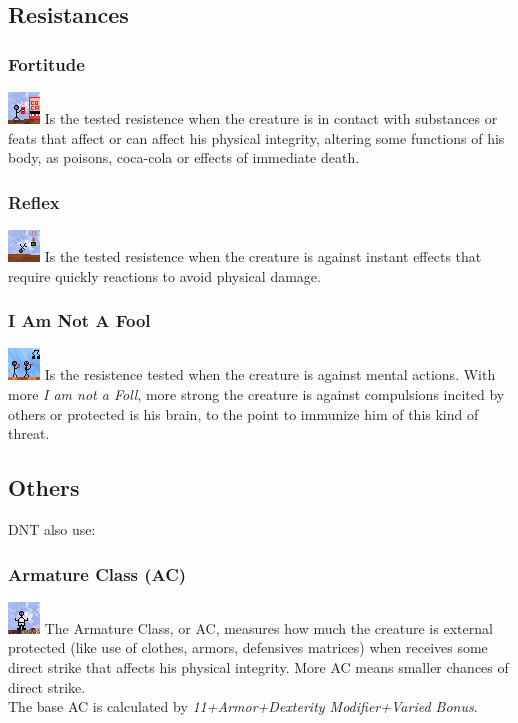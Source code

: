 \documentclass[ letterpaper,12pt]{article}
\begin{document}
\subsection{Resistances}

\subsubsection{Fortitude}
\includegraphics{../data/skills/Img/fortitude.png}
Is the tested resistence when the creature is in contact with substances or
feats that affect or can affect his physical integrity, altering some
functions of his body, as poisons, coca-cola or effects of immediate death.

\subsubsection{Reflex}
\includegraphics{../data/skills/Img/reflexos.png}
Is the tested resistence when the creature is against instant effects that
require quickly reactions to avoid physical damage.

\subsubsection{I Am Not A Fool}
\includegraphics{../data/skills/Img/vontade.png}
Is the resistence tested when the creature is against mental actions. With more
{\it I am not a Foll}, more strong the creature is against compulsions incited
by others or protected is his brain, to the point to immunize him of this kind
of threat.

\subsection{Others}
DNT also use:

\subsubsection{Armature Class (AC)}
\includegraphics{../data/skills/Img/ca.png}
The Armature Class, or AC, measures how much the creature is external protected
(like use of clothes, armors, defensives matrices) when receives some direct
strike that affects his physical integrity. More AC means smaller chances of
direct strike.\\
The base AC is calculated by {\it 11+Armor+Dexterity Modifier+Varied Bonus}.
\end{document}
